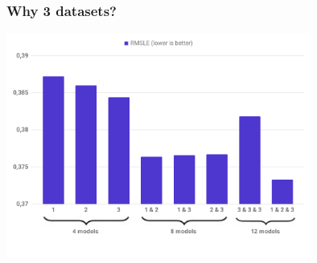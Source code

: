 \begin{frame}
\frametitle{Why 3 datasets?}






\includegraphics[width=10cm]{img/datasets_combination.png}

\end{frame}